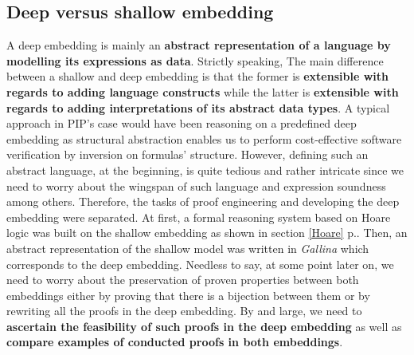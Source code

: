 \subsection{Deep versus shallow embedding}
A deep embedding is mainly an \textbf{abstract representation of a language by modelling its expressions as data}. Strictly speaking, The main difference between a shallow and deep embedding is that the former is \textbf{ extensible with regards to adding language constructs} while the latter is \textbf{extensible with regards to adding interpretations of its abstract data types}. A typical approach in PIP's case would have been reasoning on a predefined deep embedding as structural abstraction enables us to perform cost-effective software verification by inversion on formulas' structure. However, defining such an abstract language, at the beginning, is quite tedious and rather intricate since we need to worry about the wingspan of such language and expression soundness among others. Therefore, the tasks of proof engineering and developing the deep embedding were separated. At first, a formal reasoning system based on Hoare logic was built on the shallow embedding as shown in section \ref{Hoare} p.\pageref{Hoare}. Then, an abstract representation of the shallow model was written in \textit{Gallina} which corresponds to the deep embedding. Needless to say, at some point later on, we need to worry about the preservation of proven properties between both embeddings either by proving that there is a bijection between them or by rewriting all the proofs in the deep embedding. By and large, we need to \textbf{ascertain the feasibility of such proofs in the deep embedding} as well as \textbf{compare examples of conducted proofs in both embeddings}.

